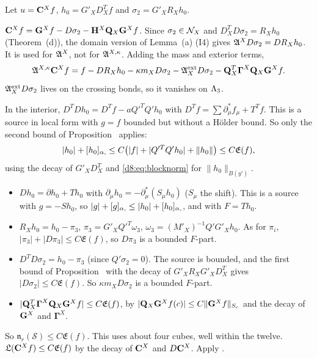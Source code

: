 \begin{detail}\label{d8:IDa}
Let $u=\mathbf C^Xf$, $h_0=G'_XD^T_Xf$ and $\sigma_2=G'_XR_Xh_0$.
\begin{step}
$\mathbf C^Xf=\mathbf G^Xf-D\sigma_2-\mathbf H^X\mathbf Q_X\mathbf G^Xf$. Since $\sigma_2\in\mathcal N_X$ and $D^T_XD\sigma_2=R_Xh_0$ (Theorem~(d)), the domain version of Lemma~(a) (I4) gives $\mathfrak A^XD\sigma_2=DR_Xh_0$. It is used for $\mathfrak A^X$, not for $\mathfrak A^{X,\kappa}$. Adding the mass and exterior terms,
\[
\mathfrak A^{X,\kappa}\mathbf C^Xf=f-DR_Xh_0-\kappa m_XD\sigma_2-\mathfrak A^{\rm ext}_XD\sigma_2-\mathbf Q_X^T\boldsymbol\Gamma^X\mathbf Q_X\mathbf G^Xf .
\]
$\mathfrak A^{\rm ext}_XD\sigma_2$ lives on the crossing bonds, so it vanishes on $\Lambda_3$.
\end{step}
\begin{step}
In the interior, $D^TDh_0=D^Tf-aQ'^TQ'h_0$ with $D^Tf=\sum\partial^*_\mu f_\mu+T^Tf$. This is a source in local form with $g=f$ bounded but without a H\"older bound. So only the second bound of Proposition~ applies:
\[
|h_0|+[h_0]_{\alpha,}\le C\big(|f|+|Q'^TQ'h_0|+\|h_0\|\big)\le C\mathfrak E(f),
\]
using the decay of $G'_XD^T_X$ and \eqref{d8:eq:blocknorm} for $\|h_0\|_{B(y')}$.
\end{step}
\begin{step}
\begin{itemize}
\item $Dh_0=\partial h_0+Th_0$ with $\partial_\mu h_0=-\partial^*_\mu(S_\mu h_0)$ ($S_\mu$ the shift). This is a source with $g=-Sh_0$, so $|g|+[g]_{\alpha,}\le|h_0|+[h_0]_{\alpha,}$, and with $F=Th_0$.
\item $R_Xh_0=h_0-\pi_3$, $\pi_3=G'_XQ'^T\omega_3$, $\omega_3=(M'_X)^{-1}Q'G'_Xh_0$. As for $\pi_i$, $|\pi_3|+|D\pi_3|\le C\mathfrak E(f)$, so $D\pi_3$ is a bounded $F$-part.
\item $D^TD\sigma_2=h_0-\pi_3$ (since $Q'\sigma_2=0$). The source is bounded, and the first bound of Proposition~ with the decay of $G'_XR_XG'_XD^T_X$ gives $|D\sigma_2|\le C\mathfrak E(f)$. So $\kappa m_XD\sigma_2$ is a bounded $F$-part.
\item $|\mathbf Q_X^T\boldsymbol\Gamma^X\mathbf Q_X\mathbf G^Xf|\le C\mathfrak E(f)$, by $|\mathbf Q_X\mathbf G^Xf(c)|\le C\|\mathbf G^Xf\|_{S_c}$ and the decay of $\mathbf G^X$ and $\boldsymbol\Gamma^X$.
\end{itemize}
So $\mathfrak n_{r}(\mathcal S)\le C\mathfrak E(f)$. This uses about four cubes, well within the twelve. $\mathfrak L(\mathbf C^Xf)\le C\mathfrak E(f)$ by the decay of $\mathbf C^X$ and $D\mathbf C^X$. Apply .
\end{step}
\end{detail}

